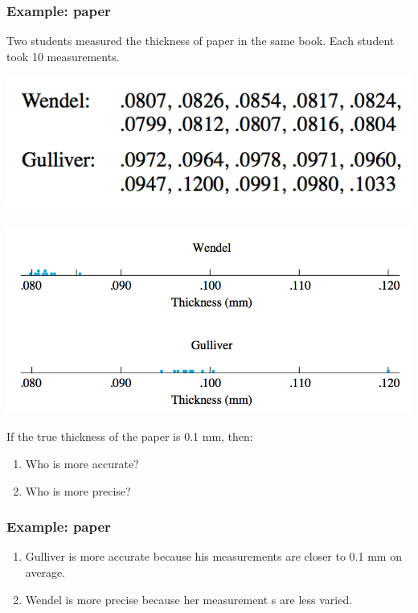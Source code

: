 \documentclass[handout]{beamer}\usepackage{graphicx, color}
\providecommand{\q}{$\quad$ \newline}
\numberwithin{equation}{section}
\begin{document}
\begin{frame}
\frametitle{Example: paper} \scriptsize
Two students measured the thickness of paper in the same book. Each student took 10 measurements.

\begin{center}
 \includegraphics{../../fig/papertable.png} \q \includegraphics{../../fig/paperdot.png} 
\end{center}

\pause If the true thickness of the paper is 0.1 mm, then:

\begin{enumerate}
\item Who is more accurate?
\item Who is more precise?
\end{enumerate}
\end{frame}

\begin{frame}
\frametitle{Example: paper}

\begin{enumerate}[1. ]
\item Gulliver is more accurate because his measurements are closer to 0.1 mm on average.
\pause \item Wendel is more precise because her measurement s are less varied.
\end{enumerate}
\end{frame}
\end{document}
